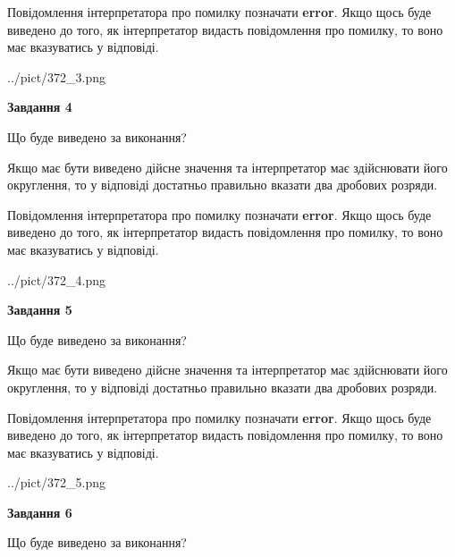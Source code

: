 \documentclass[12pt, ukrainian]{article}
\begin{document}
{\begin {Large}
Повідомлення інтерпретатора про помилку позначати \textbf{error}.
Якщо щось буде виведено до того, як інтерпретатор видасть повідомлення про помилку, 
то воно має вказуватись у відповіді. \par

\begin{center}
	{../pict/372_3.png}
\end{center}
\newpage

{\begin {center}\textbf{Завдання 4}\end {center}}\par
Що буде виведено за виконання? \par

Якщо має бути виведено дійсне значення та інтерпретатор має здійснювати його округлення, 
то у відповіді достатньо правильно вказати два дробових розряди.

Повідомлення інтерпретатора про помилку позначати \textbf{error}.
Якщо щось буде виведено до того, як інтерпретатор видасть повідомлення про помилку, 
то воно має вказуватись у відповіді. \par

\begin{center}
	{../pict/372_4.png}
\end{center}
\newpage

{\begin {center}\textbf{Завдання 5}\end {center}}\par
Що буде виведено за виконання? \par

Якщо має бути виведено дійсне значення та інтерпретатор має здійснювати його округлення, 
то у відповіді достатньо правильно вказати два дробових розряди.

Повідомлення інтерпретатора про помилку позначати \textbf{error}.
Якщо щось буде виведено до того, як інтерпретатор видасть повідомлення про помилку, 
то воно має вказуватись у відповіді. \par

\begin{center}
	{../pict/372_5.png}
\end{center}
\newpage

{\begin {center}\textbf{Завдання 6}\end {center}}\par
Що буде виведено за виконання? \par


\end{Large}}
\end{document}
